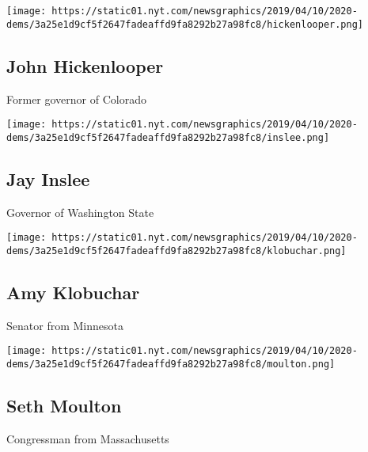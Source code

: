 \href{https://www.nytimes.com/interactive/2019/us/politics/john-hickenlooper-2020-campaign.html}{}

\texttt{[image: https://static01.nyt.com/newsgraphics/2019/04/10/2020-dems/3a25e1d9cf5f2647fadeaffd9fa8292b27a98fc8/hickenlooper.png]}

\hypertarget{john-hickenlooper}{%
\subsection{John Hickenlooper}\label{john-hickenlooper}}

Former governor of Colorado

\href{https://www.nytimes.com/interactive/2019/us/politics/jay-inslee-2020-campaign.html}{}

\texttt{[image: https://static01.nyt.com/newsgraphics/2019/04/10/2020-dems/3a25e1d9cf5f2647fadeaffd9fa8292b27a98fc8/inslee.png]}

\hypertarget{jay-inslee}{%
\subsection{Jay Inslee}\label{jay-inslee}}

Governor of Washington State

\href{https://www.nytimes.com/interactive/2019/us/politics/amy-klobuchar-2020-campaign.html}{}

\texttt{[image: https://static01.nyt.com/newsgraphics/2019/04/10/2020-dems/3a25e1d9cf5f2647fadeaffd9fa8292b27a98fc8/klobuchar.png]}

\hypertarget{amy-klobuchar}{%
\subsection{Amy Klobuchar}\label{amy-klobuchar}}

Senator from Minnesota

\href{https://www.nytimes.com/interactive/2019/us/politics/seth-moulton-2020-campaign.html}{}

\texttt{[image: https://static01.nyt.com/newsgraphics/2019/04/10/2020-dems/3a25e1d9cf5f2647fadeaffd9fa8292b27a98fc8/moulton.png]}

\hypertarget{seth-moulton}{%
\subsection{Seth Moulton}\label{seth-moulton}}

Congressman from Massachusetts

